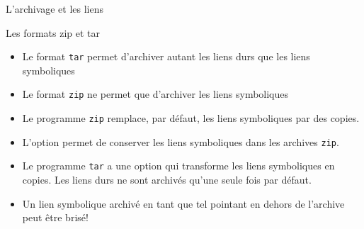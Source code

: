\begin{frame}{L'archivage et les liens}
  \begin{block}{Les formats zip et tar}
    \begin{itemize}
    \item Le format \texttt{tar} permet d'archiver autant les liens durs que les liens symboliques
    \item Le format \texttt{zip} ne permet que d'archiver les liens symboliques
    \item Le programme \texttt{zip} remplace, par défaut, les liens symboliques par des copies.
    \item L'option  permet de conserver les liens symboliques dans les archives \texttt{zip}.
    \item Le programme \texttt{tar} a une option  qui
      transforme les liens symboliques en copies. Les liens durs ne sont
      archivés qu'une seule fois par défaut.
    \item[\dialogwarning] Un lien symbolique archivé en tant que tel pointant en dehors de l'archive peut être brisé!
    \end{itemize}
  \end{block}
  \begin{example}
  \end{example}
\end{frame}
